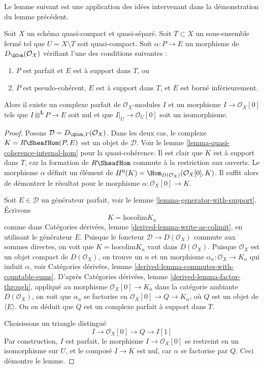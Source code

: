 \noindent
Le lemme suivant est une application des idées intervenant dans
la démonstration du lemme précédent.

\begin{lemma}
\label{lemma-map-from-pseudo-coherent-to-complex-with-support}
Soit $X$ un schéma quasi-compact et quasi-séparé. Soit $T \subset X$
un sous-ensemble fermé tel que $U = X \setminus T$ soit quasi-compact.
Soit $\alpha : P \to E$ un morphisme de $D_\QCoh(\mathcal{O}_X)$ vérifiant
l'une des conditions suivantes :
\begin{enumerate}
\item $P$ est parfait et $E$ est à support dans $T$, ou
\item $P$ est pseudo-cohérent, $E$ est à support dans $T$, et $E$ est borné inférieurement.
\end{enumerate}
Alors il existe un complexe parfait de $\mathcal{O}_X$-modules $I$
et un morphisme $I \to \mathcal{O}_X[0]$ tels que
$I \otimes^\mathbf{L} P \to E$ soit nul et que
$I|_U \to \mathcal{O}_U[0]$ soit un
isomorphisme.
\end{lemma}

\begin{proof}
Posons $\mathcal{D} = D_{\QCoh, T}(\mathcal{O}_X)$. Dans les deux cas, le complexe
$K = R\SheafHom(P, E)$ est un objet de $\mathcal{D}$. Voir le
lemme \ref{lemma-quasi-coherence-internal-hom} pour la quasi-cohérence.
Il est clair que $K$ est à support dans $T$, car la formation de $R\SheafHom$
commute à la restriction aux ouverts.
Le morphisme $\alpha$ définit un élément de
$H^0(K) = \Hom_{D(\mathcal{O}_X)}(\mathcal{O}_X[0], K)$.
Il suffit alors de démontrer le résultat pour le morphisme
$\alpha : \mathcal{O}_X[0] \to K$.

\medskip\noindent
Soit $E \in \mathcal{D}$ un générateur parfait, voir le
lemme \ref{lemma-generator-with-support}. Écrivons
$$
K = \text{hocolim} K_n
$$
comme dans Catégories dérivées, lemme \ref{derived-lemma-write-as-colimit},
en utilisant le générateur $E$. Puisque le foncteur $\mathcal{D} \to D(\mathcal{O}_X)$
commute aux sommes directes, on voit que $K = \text{hocolim} K_n$
vaut dans $D(\mathcal{O}_X)$. Puisque $\mathcal{O}_X$ est un objet compact
de $D(\mathcal{O}_X)$, on trouve un $n$ et un morphisme
$\alpha_n : \mathcal{O}_X \to K_n$ qui induit $\alpha$, voir
Catégories dérivées, lemme \ref{derived-lemma-commutes-with-countable-sums}.
D'après Catégories dérivées, lemme \ref{derived-lemma-factor-through},
appliqué au morphisme $\mathcal{O}_X[0] \to K_n$ dans la catégorie
ambiante $D(\mathcal{O}_X)$, on voit que $\alpha_n$ se factorise en
$\mathcal{O}_X[0] \to Q \to K_n$, où $Q$ est un objet
de $\langle E \rangle$. On en déduit que $Q$ est un complexe parfait
à support dans $T$.

\medskip\noindent
Choisissons un triangle distingué
$$
I \to \mathcal{O}_X[0] \to Q \to I[1]
$$
Par construction, $I$ est parfait, le morphisme $I \to \mathcal{O}_X[0]$
se restreint en un isomorphisme sur $U$, et le composé
$I \to K$ est nul, car $\alpha$ se factorise par $Q$.
Ceci démontre le lemme.
\end{proof}







